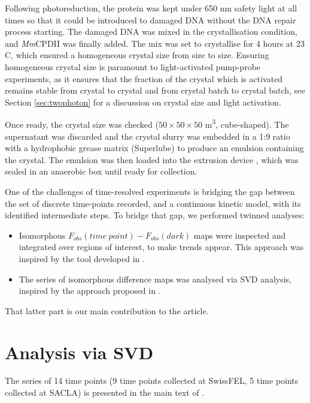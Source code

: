 Following photoreduction, the protein was kept under 650 nm safety light at all times so that it could be introduced to damaged DNA without the DNA repair process starting. The damaged DNA was mixed in the crystallisation condition, and \textit{Mm}CPDII was finally added. The mix was set to crystallise for 4 hours at 23 \degree C, which ensured a homogeneous crystal size from size to size. Ensuring homogeneous crystal size is paramount to light-activated pump-probe experiments, as it ensures that the fraction of the crystal which is activated remains stable from crystal to crystal and from crystal batch to crystal batch, see Section \ref{sec:twophoton} for a discussion on crystal size and light activation. 

Once ready, the crystal size was checked (\(50 \times 50 \times 50\) \textmu m\textsuperscript{3}, cube-shaped). The supernatant was discarded and the crystal slurry was embedded in a 1:9 ratio with a hydrophobic grease matrix (Superlube) to produce an emulsion containing the crystal. The emulsion was then loaded into the extrusion device \parencite{weierstallLipidicCubicPhase2014}, which was sealed in an anaerobic box until ready for collection. 

One of the challenges of time-resolved experiments is bridging the gap between the set of discrete time-points recorded, and a continuous kinetic model, with its identified intermediate steps. To bridge that gap, we performed twinned analyses: 
\begin{itemize}
  \item Isomorphous \(F_{obs}(time\ point) - F_{obs}(dark)\) maps were inspected and integrated over regions of interest, to make trends appear. This approach was inspired by the tool developed in \cite{wickstrandToolVisualizingProtein2020}.
  \item The series of isomorphous difference maps was analysed via SVD analysis, inspired by the approach proposed in \cite{schmidtApplicationSingularValue2003}.
\end{itemize}

That latter part is our main contribution to the article. 

\section{Analysis via SVD}
The series of 14 time points (9 time points collected at SwissFEL, 5 time points collected at SACLA) is presented in the main text of \cite{maestre-reynaVisualizingDNARepair2023a}. 

